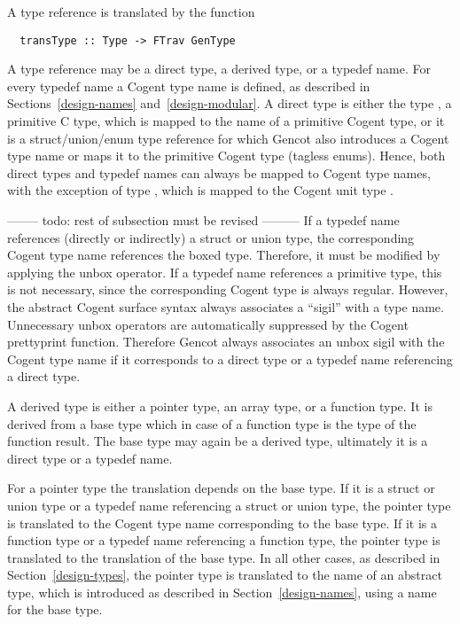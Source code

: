 A type reference is translated by the function
\begin{verbatim}
  transType :: Type -> FTrav GenType
\end{verbatim}

A type reference may be a direct type, a derived type, or a typedef name. For every typedef name a Cogent type
name is defined, as described in Sections~\ref{design-names} and~\ref{design-modular}. A direct type is either
the type , a primitive C type, which is mapped to the name of a primitive Cogent type, or it is a 
struct/union/enum type reference for which Gencot also introduces a Cogent type name or maps it to the 
primitive Cogent type  (tagless enums). Hence, both direct types and typedef names can always be mapped
to Cogent type names, with the exception of type , which is mapped to the Cogent unit type \code{()}.

-------- todo: rest of subsection must be revised ---------
If a typedef name references (directly or indirectly) a struct or union type, the corresponding Cogent
type name references the boxed type. Therefore, it must be modified by applying the unbox operator. If a typedef
name references a primitive type, this is not necessary, since the corresponding Cogent type is always regular.
However, the abstract Cogent surface syntax always associates a ``sigil'' with a type name. Unnecessary
unbox operators are automatically suppressed by the Cogent prettyprint function. Therefore Gencot always 
associates an unbox sigil with the Cogent type name if it corresponds to a direct type or a typedef name
referencing a direct type.

A derived type is either a pointer type, an array type, or a function type. It is derived from a base type
which in case of a function type is the type of the function result. The base type may again be a derived
type, ultimately it is a direct type or a typedef name.

For a pointer type the translation depends on the base type. If it is a struct or union type or a typedef
name referencing a struct or union type, the pointer type is translated to the Cogent type name corresponding
to the base type. If it is a function type or a typedef name referencing a function type, the pointer type 
is translated to the translation of the base type. In all other cases, as described in Section~\ref{design-types}, 
the pointer type is translated to the name of an abstract type, which is introduced as described in 
Section~\ref{design-names}, using a name for the base type. 

